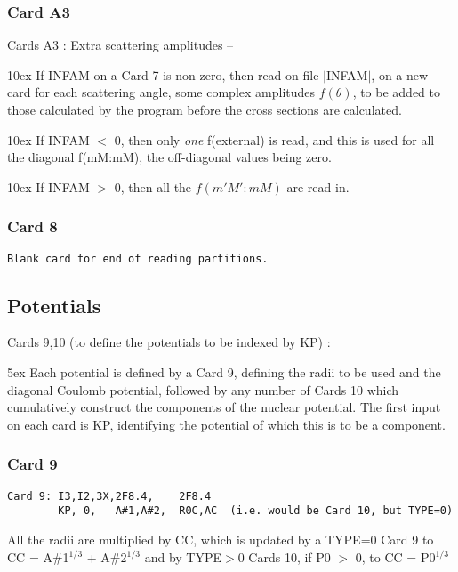 \documentclass[11pt]{article}
\begin{document}
%
\subsubsection*{Card A3}

Cards A3 :  Extra scattering amplitudes --
\bigskip

\hangindent 10ex
If INFAM on a Card 7 is non-zero, then read on file $|$INFAM$|$, on a new card
for each scattering angle, some complex amplitudes $f(\theta)$,
to be added to those calculated by the program before the cross
sections are calculated.


\hangindent 10ex
If INFAM $<$ 0, then only
{\em one} f(external) is read, and this is used for all the diagonal
f(mM:mM), the off-diagonal values being zero.

\hangindent 10ex
If INFAM $>$ 0, then all the $f(m'M':mM)$ are read in.
%
\subsubsection*{Card 8}
\begin{verbatim}
Blank card for end of reading partitions.
\end{verbatim}
\newpage
\subsection{Potentials}
%
\bigskip

 Cards 9,10 (to define the potentials to be indexed by KP) :


\hangindent 5ex
Each potential is defined by a Card 9, defining the radii to be used
and the diagonal Coulomb potential, followed by any number of Cards 10
which cumulatively construct the components of the nuclear potential.
The first input on each card is KP, identifying the potential of which this
is to be a component.

\subsubsection*{Card 9}
\begin{verbatim}
Card 9: I3,I2,3X,2F8.4,    2F8.4
        KP, 0,   A#1,A#2,  R0C,AC  (i.e. would be Card 10, but TYPE=0)
\end{verbatim}
    All the radii are multiplied by CC,
       which is updated by a TYPE=0 Card 9 to CC = A\#1$^{1/3}$ + A\#2$^{1/3}$
       and by TYPE$>$0 Cards 10, if P0 $>$ 0,  to CC = P0$^{1/3}$
\end{document}
